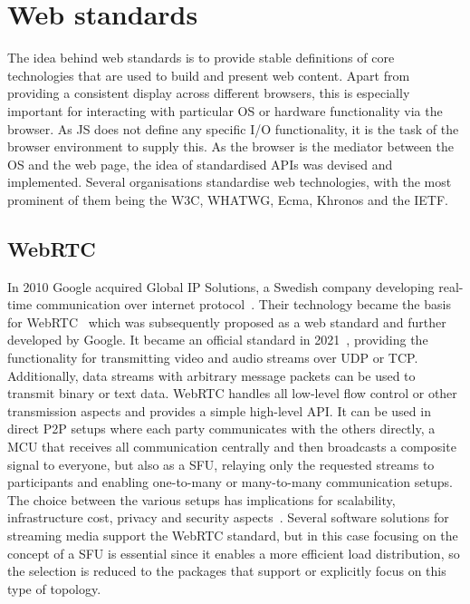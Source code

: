 \section{Web standards}
\label{sec:webstandards}

The idea behind web standards is to provide stable definitions of core technologies that are used to build and present web content.
Apart from providing a consistent display across different browsers, this is especially important for interacting with particular \ac{OS} or hardware functionality via the browser.
As \ac{JS} does not define any specific \ac{I/O} functionality, it is the task of the browser environment to supply this.
As the browser is the mediator between the \ac{OS} and the web page, the idea of standardised \ac{API}s was devised and implemented.
Several organisations standardise web technologies, with the most prominent of them being the \ac{W3C}, \ac{WHATWG}, Ecma, Khronos and the \ac{IETF}.

\subsection{WebRTC}

In 2010 Google acquired Global IP Solutions, a Swedish company developing real-time communication over internet protocol~\parencite{googleGlobalIpAcquisition}.
Their technology became the basis for \ac{WebRTC}~\parencite{webRtcGlobalIPSolutions} which was subsequently proposed as a web standard and further developed by Google.
It became an official standard in 2021~\parencite{webRtcOfficialWebStandard}, providing the functionality for transmitting video and audio streams over \ac{UDP} or \ac{TCP}.
Additionally, data streams with arbitrary message packets can be used to transmit binary or text data.
WebRTC handles all low-level flow control or other transmission aspects and provides a simple high-level \ac{API}.
It can be used in direct \ac{P2P} setups where each party communicates with the others directly, a \ac{MCU} that receives all communication centrally and then broadcasts a composite signal to everyone, but also as a \ac{SFU}, relaying only the requested streams to participants and enabling one-to-many or many-to-many communication setups.
The choice between the various setups has implications for scalability, infrastructure cost, privacy and security aspects~\parencite{webRtcArchitectures}.
Several software solutions for streaming media support the \ac{WebRTC} standard, but in this case focusing on the concept of a \ac{SFU} is essential since it enables a more efficient load distribution, so the selection is reduced to the packages that support or explicitly focus on this type of topology.

